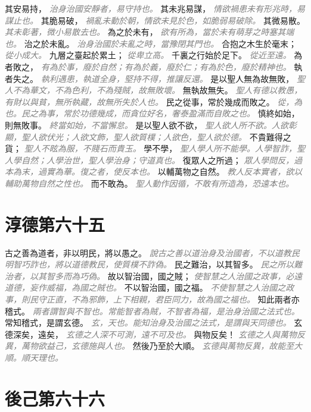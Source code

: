 \documentclass[a4paper,zihao=-4,oneside,landscape,UTF8]{ctexart}
\newcommand{\zhushi}[1]{\scriptsize{\textit{\textcolor{gray}{#1}}}\normalsize}
\begin{document}
其安易持，
\zhushi{治身治國安靜者，易守持也。}
其未兆易謀，
\zhushi{情欲禍患未有形兆時，易謀止也。}
其脆易破，
\zhushi{禍亂未動於朝，情欲未見於色，如脆弱易破除。}
其微易散。
\zhushi{其未彰著，微小易散去也。}
為之於未有，
\zhushi{欲有所為，當於未有萌芽之時塞其端也。}
治之於未亂。
\zhushi{治身治國於未亂之時，當豫閉其門也。}
合抱之木生於毫末；
\zhushi{從小成大。}
九層之臺起於累土；
\zhushi{從卑立高。}
千裏之行始於足下。
\zhushi{從近至遠。}
為者敗之，
\zhushi{有為於事，廢於自然；有為於義，廢於仁；有為於色，廢於精神也。}
執者失之。
\zhushi{執利遇患，執道全身，堅持不得，推讓反還。}
是以聖人無為故無敗，
\zhushi{聖人不為華文，不為色利，不為殘賊，故無敗壞。}
無執故無失。
\zhushi{聖人有德以教愚，有財以與貧，無所執藏，故無所失於人也。}
民之從事，常於幾成而敗之。
\zhushi{從，為也。民之為事，常於功德幾成，而貪位好名，奢泰盈滿而自敗之也。}
慎終如始，則無敗事。
\zhushi{終當如始，不當懈怠。}
是以聖人欲不欲，
\zhushi{聖人欲人所不欲。人欲彰顯，聖人欲伏光；人欲文飾，聖人欲質樸；人欲色，聖人欲於德。}
不貴難得之貨；
\zhushi{聖人不眩為服，不賤石而貴玉。}
學不學，
\zhushi{聖人學人所不能學。人學智詐，聖人學自然；人學治世，聖人學治身；守道真也。}
復眾人之所過；
\zhushi{眾人學問反，過本為末，過實為華。復之者，使反本也。}
以輔萬物之自然。
\zhushi{教人反本實者，欲以輔助萬物自然之性也。}
而不敢為。
\zhushi{聖人動作因循，不敢有所造為，恐遠本也。}


\section{淳德第六十五}

古之善為道者，非以明民，將以愚之。
\zhushi{說古之善以道治身及治國者，不以道教民明智巧詐也，將以道德教民，使質樸不詐偽。}
民之難治，以其智多。
\zhushi{民之所以難治者，以其智多而為巧偽。}
故以智治國，國之賊；
\zhushi{使智慧之人治國之政事，必遠道德，妄作威福，為國之賊也。}
不以智治國，國之福。
\zhushi{不使智慧之人治國之政事，則民守正直，不為邪飾，上下相親，君臣同力，故為國之福也。}
知此兩者亦稽式。
\zhushi{兩者謂智與不智也。常能智者為賊，不智者為福，是治身治國之法式也。}
常知稽式，是謂玄德。
\zhushi{玄，天也。能知治身及治國之法式，是謂與天同德也。}
玄德深矣，遠矣，
\zhushi{玄德之人深不可測，遠不可及也。}
與物反矣！
\zhushi{玄德之人與萬物反異，萬物欲益己，玄德施與人也。}
然後乃至於大順。
\zhushi{玄德與萬物反異，故能至大順。順天理也。}


\section{後己第六十六}
\end{document}
